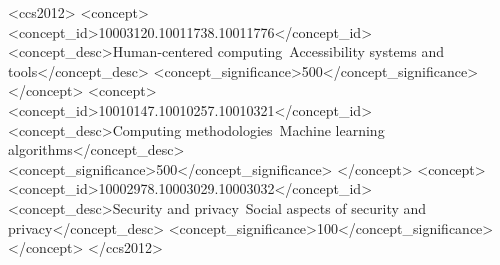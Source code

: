 \documentclass[manuscript,screen,review]{acmart}
\begin{document}
\begin{CCSXML}
  <ccs2012>
  <concept>
  <concept_id>10003120.10011738.10011776</concept_id>
  <concept_desc>Human-centered computing~Accessibility systems and tools</concept_desc>
  <concept_significance>500</concept_significance>
  </concept>
  <concept>
  <concept_id>10010147.10010257.10010321</concept_id>
  <concept_desc>Computing methodologies~Machine learning algorithms</concept_desc>
  <concept_significance>500</concept_significance>
  </concept>
  <concept>
  <concept_id>10002978.10003029.10003032</concept_id>
  <concept_desc>Security and privacy~Social aspects of security and privacy</concept_desc>
  <concept_significance>100</concept_significance>
  </concept>
  </ccs2012>
\end{CCSXML}





\maketitle
\end{document}
